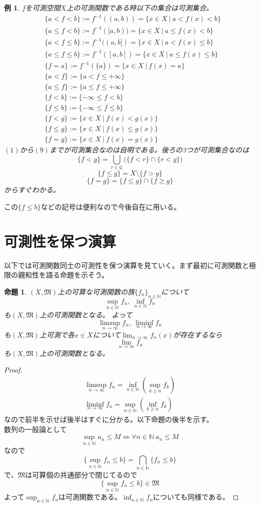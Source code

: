 \documentclass[leqno]{jsarticle}
\newtheorem{prop}[thm]{命題}
\newtheorem{exam}[thm]{例}
\newcommand{\nn}{\mathbb{N}}
\newcommand{\qq}{\mathbb{Q}}
\newcommand{\mgn}{\infty}
\newcommand{\dpst}{\displaystyle}
\newcommand{\mm}{\mathfrak{M}}
\newcommand{\ffnn}{\{f_{n}\}_{n\in \nn}}
\begin{document}
\setcounter{equation}{0}
\begin{exam}$f$を可測空間$X$上の可測関数である時以下の集合は可測集合。
\begin{eqnarray}
&\{a<f<b\}:=f^{-1}((a,b))=\{x\in X\ |\ a<f(x)<b\}\\ 
&\{a\le f<b\}:=f^{-1}([a,b))=\{x\in X\ |\ a\le f(x)<b\}\\ 
&\{a<f\le b\}:=f^{-1}((a,b])=\{x\in X\ |\ a<f(x)\le b\}\\ 
&\{a\le f\le b\}:=f^{-1}([a,b])=\{x\in X\ |\ a\le f(x)\le b\}\\ 
&\{f=a\}:=f^{-1}(\{a\})=\{x\in X\ |\ f(x)=a\}\\ 
&\{a<f\}:=\{a<f\le +\mgn\}\\ 
&\{a\le f\}:=\{a\le f\le +\mgn\}\\ 
&\{f< b\}:=\{-\mgn\le f<b\}\\ 
&\{f\le b\}:=\{-\mgn \le f\le b\}\\ 
&\{f< g\}:=\{x\in X\ |\ f(x)<g(x)\}\\ 
&\{f\le g\}:=\{x\in X\ |\ f(x)\le g(x)\}\\ 
&\{f=g\}:=\{x\in X\ |\ f(x)=g(x)\}
\end{eqnarray}
$(1)$から$(9)$までが可測集合なのは自明である。後ろの3つが可測集合なのは
\[
\{f<g\}=\bigcup_{r\in \qq}\Bigr(\{f<r\}\cap\{r<g\}\Bigr)
\]
\[
\{f\le g\}=X\setminus \{f>g\}
\]
\[
\{f=g\}=\{f\le g\}\cap\{f\ge g\}
\]
からすぐわかる。
\end{exam}
この$\{f\le b\}$などの記号は便利なので今後自在に用いる。

\section{可測性を保つ演算}
以下では可測関数同士の可測性を保つ演算を見ていく。まず最初に可測関数と極限の親和性を語る命題を示そう。
\begin{prop}\label{sup}$(X,\mm)$上の可算な可測関数の族$\ffnn$について
\[
\sup_{n\in\nn}f_n,\ \inf_{n\in\nn}f_n
\]
も$(X,\mm)$上の可測関数となる。
よって
\[
\limsup_{n\to\mgn} f_n,\ \liminf_{n\to\mgn} f_n
\]
も$(X,\mm)$上可測で各$x\in X$について$\dpst \lim_{n\to \mgn}f_n(x)$が存在するなら
\[
\lim_{n\to\mgn}f_n
\]
も$(X,\mm)$上の可測関数となる。
\end{prop}
\begin{proof}
\begin{eqnarray*}
\limsup_{n\to\mgn} f_n=\inf_{n\in\nn}(\sup_{k\ge n}f_k)\\ 
\liminf_{n\to\mgn} f_n=\sup_{n\in\nn}(\inf_{k\ge n}f_k)
\end{eqnarray*}
なので前半を示せば後半はすぐに分かる。以下命題の後半を示す。\\ 
数列の一般論として
\[
\sup_{n\in\nn} a_n\le M\iff \forall n\in \nn \  a_n\le M
\]
なので
\[
\{\sup_{n\in\nn}f_n \le b\}=\bigcap_{n\in \nn}\{f_n\le b\}
\]
で、$\mm$は可算個の共通部分で閉じてるので
\[
\{\sup_{n\in\nn}f_n \le b\}\in \mm
\]
よって$\dpst \sup_{n\in \nn}f_n$は可測関数である。$\dpst \inf_{n\in \nn}f_n$についても同様である。
\end{proof}
\end{document}

